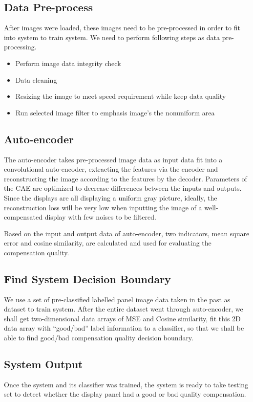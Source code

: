 \documentclass[runningheads]{llncs}
\begin{document}
\subsection{Data Pre-process}
After images were loaded, these images need to be pre-processed in order to fit into system to train system. We need to perform following steps as data pre-processing.
\begin{itemize}
    \item{Perform image data integrity check}
    \item{Data cleaning}
    \item{Resizing the image to meet speed requirement while keep data quality}
    \item{Run selected image filter to emphasis image’s the nonuniform area}
\end{itemize}

\subsection{Auto-encoder}
The auto-encoder takes pre-processed image data as input data fit into a convolutional auto-encoder, extracting the features via the encoder and reconstructing the image according to the features by the decoder. Parameters of the CAE are optimized to decrease differences between the inputs and outputs. Since the displays are all displaying a uniform gray picture, ideally, the reconstruction loss will be very low when inputting the image of a well-compensated display with few noises to be filtered.

Based on the input and output data of auto-encoder, two indicators, mean square error and cosine similarity, are calculated and used for evaluating the compensation quality.

\subsection{Find System Decision Boundary}
We use a set of pre-classified labelled panel image data taken in the past as dataset to train system. After the entire dataset went through auto-encoder, we shall get two-dimensional data arrays of MSE and Cosine similarity, fit this 2D data array with “good/bad” label information to a classifier, so that we shall be able to find good/bad compensation quality decision boundary.
\subsection{System Output}
Once the system and its classifier was trained, the system is ready to take testing set to detect whether the display panel had a good or bad quality compensation.
%
%
\end{document}
